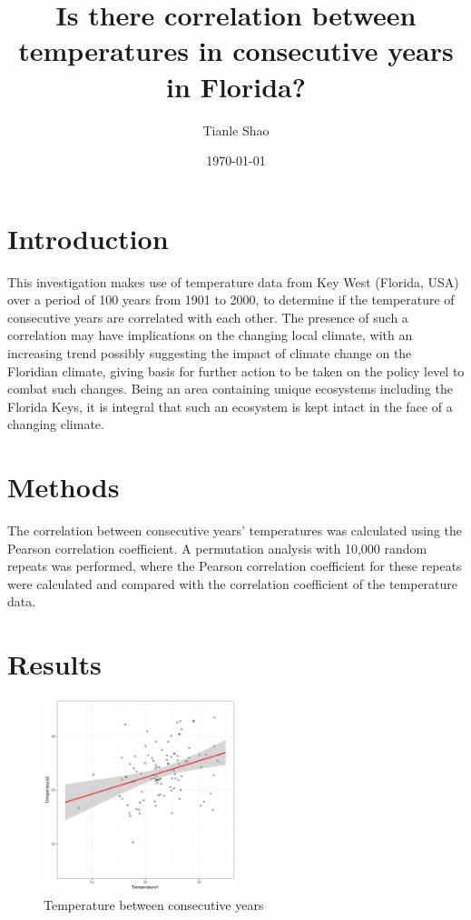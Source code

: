 \documentclass[a4paper,12pt, twocolumn]{article}
\title{Is there correlation between temperatures in consecutive years in Florida?}
\author{Tianle Shao}
\date{\today}
\begin{document}
\maketitle

\section{Introduction}
This investigation makes use of temperature data from Key West (Florida, USA) over a period of 100 years from 1901 to 2000, to determine if the temperature of consecutive years are correlated with each other. The presence of such a correlation may have implications on the changing local climate, with an increasing trend possibly suggesting the impact of climate change on the Floridian climate, giving basis for further action to be taken on the policy level to combat such changes. Being an area containing unique ecosystems including the Florida Keys, it is integral that such an ecosystem is kept intact in the face of a changing climate.

\section{Methods}
The correlation between consecutive years' temperatures was calculated using the Pearson correlation coefficient. A permutation analysis with 10,000 random repeats was performed, where the Pearson correlation coefficient for these repeats were calculated and compared with the correlation coefficient of the temperature data.

\section{Results}
  \begin{figure}[ht]
    \centering
    \includegraphics[width=0.5\textwidth]{../data/ats_plot.png}
    \caption{Temperature between consecutive years}
  \end{figure}
  
\end{document}
